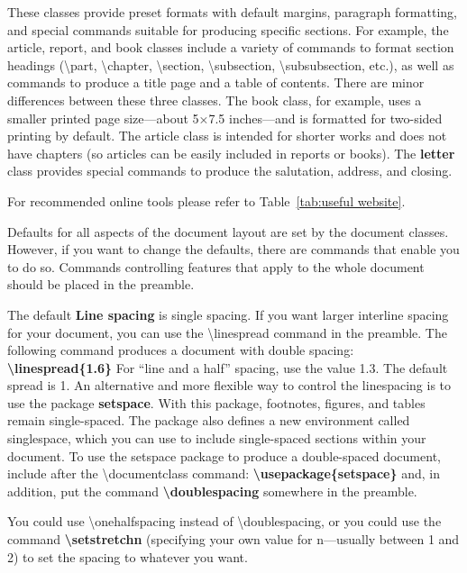 \documentclass[a4paper,11pt,UTF8,openright]{book}
\begin{document}
These classes provide preset formats with default margins, paragraph formatting, and
special commands suitable for producing specific sections. For example, the article,
report, and book classes include a variety of commands to format section headings
(\textbackslash part, \textbackslash chapter, \textbackslash section, \textbackslash subsection, \textbackslash subsubsection, etc.), as well as commands to produce a title page and a table of contents. There are minor differences between these three classes. The book class, for example, uses a smaller printed page size—about 5×7.5 inches—and is formatted for two-sided printing by default. The article class is intended for shorter works and does not have chapters (so articles can be easily included in reports or books). The \textbf{letter} class provides special commands to produce the salutation, address, and closing.


\noindent For recommended online tools please refer to Table~\ref{tab:useful website}.

Defaults for all aspects of the document layout are set by the document classes. However,
if you want to change the defaults, there are commands that enable you to do so.
Commands controlling features that apply to the whole document should be placed in
the preamble.

The default \textbf{Line spacing} is single spacing. If you want larger interline spacing for your document, you can use the \textbackslash linespread command in the preamble. The following command produces a document with double spacing: \textbf{\textbackslash linespread\{1.6\}} For “line and a half” spacing, use the value 1.3. The default spread is 1. An alternative and more flexible way to control the linespacing is to use the package \textbf{setspace}. With this package, footnotes, figures, and tables remain single-spaced. The package also defines a new environment called singlespace, which you can use to include single-spaced sections within your document. To use the setspace package to produce a double-spaced document, include after the \textbackslash documentclass command: \textbf{\textbackslash usepackage\{setspace\}} and, in addition, put the command \textbf{\textbackslash doublespacing} somewhere in the preamble.

You could use \textbackslash onehalfspacing instead of \textbackslash doublespacing, or you could use the command \textbf{\textbackslash setstretch{n}} (specifying your own value for n—usually between 1 and 2) to set the spacing to whatever you want.
\end{document}
